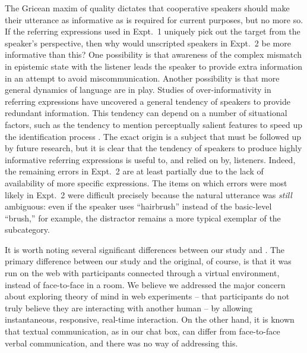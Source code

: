 \documentclass[10pt,letterpaper]{article}
\begin{document}
The Gricean maxim of quality dictates that cooperative speakers should make their utterance as informative as is required for current purposes, but no more so. If the referring expressions used in Expt.~1 uniquely pick out the target from the speaker's perspective, then why would unscripted speakers in Expt.~2 be more informative than this? 
One possibility is that awareness of the complex mismatch in epistemic state with the listener leads the speaker to provide extra information in an attempt to avoid miscommunication.
Another possibility is that more general dynamics of language are in play.
Studies of over-informativity in referring expressions have uncovered a general tendency of speakers to provide redundant information.
This tendency can depend on a number of situational factors, such as the tendency to mention perceptually salient features to speed up the identification process  \cite{KoolenGattGoudbeekKrahmer11_Overspecification}. 
The exact origin is a subject that must be followed up by future research, but it is clear that the tendency of speakers to produce highly informative referring expressions is useful to, and relied on by, listeners.
Indeed, the remaining errors in Expt.~2 are at least partially due to the lack of availability of more specific expressions. 
The items on which errors were most likely in Expt.~2 were difficult precisely because the natural utterance was \emph{still} ambiguous: even if the speaker uses ``hairbrush'' instead of the basic-level ``brush,'' for example, the distractor remains a more typical exemplar of the subcategory.



It is worth noting several significant differences between our study and .
The primary difference between our study and the original, of course, is that it was run on the web with participants connected through a virtual environment, instead of face-to-face in a room. We believe we addressed the major concern about exploring theory of mind in web experiments -- that participants do not truly believe they are interacting with another human -- by allowing instantaneous, responsive, real-time interaction.  On the other hand, it is known that textual communication, as in our chat box, can differ from face-to-face verbal communication, and there was no way of addressing this. %
\end{document}
